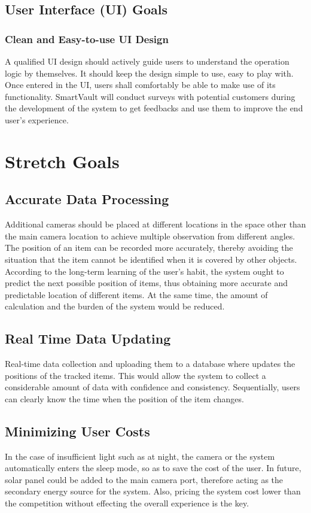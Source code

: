 \documentclass{article}
\begin{document}
\subsection{User Interface (UI) Goals}
\subsubsection{Clean and Easy-to-use UI Design}
A qualified UI design should actively guide users to understand the operation logic by themselves. It should keep the design simple to use, easy to play with. Once entered in the UI, users shall comfortably be able to make use of its functionality. SmartVault will conduct surveys with potential customers during the development of the system to get feedbacks and use them to improve the end user’s experience.
\section{Stretch Goals}
\subsection{Accurate Data Processing}
Additional cameras should be placed at different locations in the space other than the main camera location to achieve multiple observation from different angles. The position of an item can be recorded more accurately, thereby avoiding the situation that the item cannot be identified when it is covered by other objects. According to the long-term learning of the user’s habit, the system ought to predict the next possible position of items, thus obtaining more accurate and predictable location of different items. At the same time, the amount of calculation and the burden of the system would be reduced.
\subsection{Real Time Data Updating}
Real-time data collection and uploading them to a database where updates the positions of the tracked items. This would allow the system to collect a considerable amount of data with confidence and consistency. Sequentially, users can clearly know the time when the position of the item changes.
\subsection{Minimizing User Costs}
In the case of insufficient light such as at night, the camera or the system automatically enters the sleep mode, so as to save the cost of the user. In future, solar panel could be added to the main camera port, therefore acting as the secondary energy source for the system. Also, pricing the system cost lower than the competition without effecting the overall experience is the key.
\end{document}
